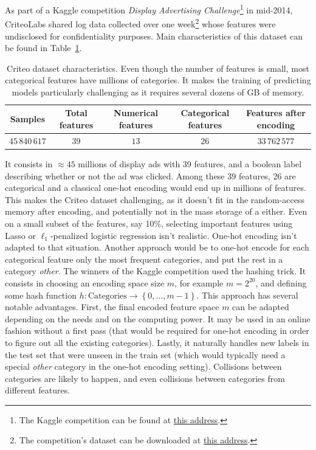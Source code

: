 As part of a Kaggle competition \emph{Display Advertising Challenge}\footnote{
    The Kaggle competition can be found at
    \href{https://www.kaggle.com/c/criteo-display-ad-challenge}{this address}.
}
in mid-2014, CriteoLabs shared log data collected over one week\footnote{
    The competition's dataset can be downloaded at
    \href{https://labs.criteo.com/2014/02/download-kaggle-display-advertising-challenge-dataset/}{this address}.
}
whose features were undisclosed for confidentiality purposes.
Main characteristics of this dataset can be found in Table~\ref{tab:criteo_dataset}.
\begin{table}[!htb]
    \centering
    \setlength{\tabcolsep}{2pt}
    {\small
    \begin{tabular}{|c|c|c|c|c|}\hline
    \textbf{Samples} & \textbf{Total features} & \textbf{Numerical features} & \textbf{Categorical features} & \textbf{Features after encoding}\\ \hline
    $45\,840\,617$ & $39$  & $13$ & $26$ & $33\,762\,577$ \\ \hline
    \end{tabular}
    }%
    \caption[short]{
        Criteo dataset characteristics.
        Even though the number of features is small,
        most categorical features have millions of categories.
        It makes the training of predicting models particularly challenging as it requires several
        dozens of GB of memory.
    }
    \label{tab:criteo_dataset}
\end{table}
It consists in $\approx 45$ millions of display ads with 39 features,
and a boolean label describing whether or not the ad was clicked.
Among these 39 features, 26 are categorical and a classical one-hot encoding would end up in millions of features.
This makes the Criteo dataset challenging, as it doesn't fit in the random-access memory after encoding,
and potentially not in the mass storage of a either.
Even on a small subset of the features, say 10\%,
selecting important features using Lasso or $\ell_1$-penalized logistic regression isn't realistic.
One-hot encoding isn't adapted to that situation.
Another approach would be to one-hot encode for each categorical feature only the most frequent categories,
and put the rest in a category \textit{other}.
The winners of the Kaggle competition used the hashing trick.
It consists in choosing an encoding space size $m$,
for example $m = 2^{20}$,
and defining some hash function $h \colon \text{Categories} \to \left\{ 0, \dots, m - 1 \right\}$.
This approach has several notable advantages.
First, the final encoded feature space $m$ can be adapted depending on the needs and on the computing power.
It may be used in an online fashion without a first pass
(that would be required for one-hot encoding in order to figure out all the existing categories).
Lastly, it naturally handles new labels in the test set that were unseen in the train set
(which would typically need a special \textit{other} category in the one-hot encoding setting).
Collisions between categories are likely to happen,
and even collisions between categories from different features.

